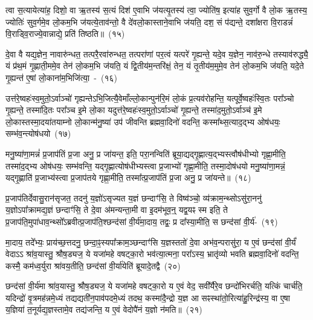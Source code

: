 त्वा स॒त्यायेत्या॑ह॒ दिशो॒ वा ऋ॒तस्य॑ स॒त्यं दिश॑ ए॒वाभि ज॑यत्यृ॒तस्य॑ त्वा॒ ज्योति॑ष॒ इत्या॑ह सुव॒र्गो वै लो॒क ऋ॒तस्य॒ ज्योतिः॑ सुव॒र्गमे॒व लो॒कम॒भि ज॑यत्ये॒ताव॑न्तो॒ वै दे॑वलो॒कास्ताने॒वाभि ज॑यति॒ दश॒ सं प॑द्यन्ते॒ दशा᳚क्षरा वि॒राडन्नं॑ वि॒राड्वि॒राज्ये॒वान्नाद्ये॒ प्रति॑ तिष्ठति॥~(१५)

{\anuvakamend[{व्यो॑मन ऋ॒तस्य॑ प्रा॒णः प॒शूने॒व विध॑र्म॒ दिव॑मे॒वाभि ज॑यत्यृ॒तस्य॒ षट्च॑त्वारिꣳशच्च}]}%

दे॒वा वै यद्य॒ज्ञेन॒ नावारु॑न्धत॒ तत्परै॒रवा॑रुन्धत॒ तत्परा॑णां पर॒त्वं यत्परे॑ गृ॒ह्यन्ते॒ यदे॒व य॒ज्ञेन॒ नाव॑रु॒न्धे तस्याव॑रुद्ध्यै॒ यं प्र॑थ॒मं गृ॒ह्णाती॒ममे॒व तेन॑ लो॒कम॒भि ज॑यति॒ यं द्वि॒तीय॑म॒न्तरि॑क्षं॒ तेन॒ यं तृ॒तीय॑म॒मुमे॒व तेन॑ लो॒कम॒भि ज॑यति॒ यदे॒ते गृ॒ह्यन्त॑ ए॒षां लो॒काना॑म॒भिजि॑त्या॒~-~(१६)

उत्त॑रे॒ष्वहः॑स्व॒मुतो॒\-ऽर्वाञ्चो॑ गृह्यन्ते\-ऽभि॒जित्यै॒वेमाँल्लो॒कान्पुन॑रि॒मं लो॒कं प्र॒त्यव॑रोहन्ति॒ यत्पूर्वे॒ष्वहः॑स्वि॒तः परा᳚ञ्चो गृ॒ह्यन्ते॒ तस्मा॑दि॒तः परा᳚ञ्च इ॒मे लो॒का यदुत्त॑रे॒ष्वहः॑स्व॒मुतो॒\-ऽर्वाञ्चो॑ गृ॒ह्यन्ते॒ तस्मा॑द॒मुतो॒\-ऽर्वाञ्च॑ इ॒मे लो॒कास्तस्मा॒द\-या॑तयाम्नो लो॒कान्म॑नु॒ष्या॑ उप॑ जीवन्ति ब्रह्मवा॒दिनो॑ वदन्ति॒ कस्मा᳚थ्स॒त्याद॒द्भ्य ओष॑धयः॒ सम्भ॑व॒न्त्योष॑धयो~(१७)

मनु॒ष्या॑णा॒मन्नं॑ प्र॒जा\-प॑तिं प्र॒जा अनु॒ प्र जा॑यन्त॒ इति॒ परा॒नन्विति॑ ब्रूया॒द्यद्गृ॒ह्णात्य॒द्भ्यस्त्वौष॑धीभ्यो गृह्णा॒मीति॒ तस्मा॑द॒द्भ्य ओष॑धयः॒ सम्भ॑वन्ति॒ यद्गृ॒ह्णात्योष॑धीभ्यस्त्वा प्र॒जाभ्यो॑ गृह्णा॒मीति॒ तस्मा॒दोष॑धयो मनु॒ष्या॑णा॒मन्नं॒ यद्गृ॒ह्णाति॑ प्र॒जाभ्य॑स्त्वा प्र॒जा\-प॑तये गृह्णा॒मीति॒ तस्मा᳚त्प्र॒जा\-प॑तिं प्र॒जा अनु॒ प्र जा॑यन्ते॥~(१८)

{\anuvakamend[{अ॒भिजि॑त्या॒ ओष॑धयो॒\-ऽष्टाच॑त्वारिꣳशच्च}]}%

प्र॒जा\-प॑तिर्देवासु॒रान॑सृजत॒ तदनु॑ य॒ज्ञो॑\-ऽसृज्यत य॒ज्ञं छन्दाꣳ॑सि॒ ते विष्व॑ञ्चो॒ व्य॑क्राम॒न्थ्सो\-ऽसु॑रा॒ननु॑ य॒ज्ञो\-ऽपा᳚क्रामद्य॒ज्ञं छन्दाꣳ॑सि॒ ते दे॒वा अ॑मन्यन्ता॒मी वा इ॒दम॑भूव॒न्॒ यद्व॒यꣴ स्म इति॒ ते प्र॒जा\-प॑ति॒मुपा॑धाव॒न्थ्सो᳚\-ऽब्रवीत्प्र॒जा\-प॑ति॒श्छन्द॑सां वी॒र्य॑मा॒दाय॒ तद्वः॒ प्र दा᳚स्या॒मीति॒ स छन्द॑सां वी॒र्य॑-~(१९)

मा॒दाय॒ तदे᳚भ्यः॒ प्राय॑च्छ॒त्तदनु॒ छन्दा॒ꣴ॒स्यपा᳚क्राम॒ञ्छन्दाꣳ॑सि य॒ज्ञस्ततो॑ दे॒वा अभ॑व॒न्परासु॑रा॒ य ए॒वं छन्द॑सां वी॒र्यं॑ वेदाऽऽ श्रा॑व॒यास्तु॒ श्रौष॒ड्यज॒ ये यजा॑महे वषट्का॒रो भव॑त्या॒त्मना॒ परा᳚\-ऽस्य॒ भ्रातृ॑व्यो भवति ब्रह्मवा॒दिनो॑ वदन्ति॒ कस्मै॒ कम॑ध्व॒र्युरा श्रा॑वय॒तीति॒ छन्द॑सां वी॒र्या॑येति॑ ब्रूयादे॒तद्वै~(२०)

छन्द॑सां वी॒र्य॑मा श्रा॑व॒यास्तु॒ श्रौष॒ड्यज॒ ये यजा॑महे वषट्का॒रो य ए॒वं वेद॒ सवी᳚र्यैरे॒व छन्दो॑भिरर्चति॒ यत्किं चार्च॑ति॒ यदिन्द्रो॑ वृ॒त्रमह॑न्नमे॒ध्यं तद्यद्यती॑न॒पाव॑पदमे॒ध्यं तदथ॒ कस्मा॑दै॒न्द्रो य॒ज्ञ आ सꣴस्था॑तो॒रित्या॑हु॒रिन्द्र॑स्य॒ वा ए॒षा य॒ज्ञिया॑ त॒नूर्यद्य॒ज्ञस्तामे॒व तद्य॑जन्ति॒ य ए॒वं वेदोपै॑नं य॒ज्ञो न॑मति॥~(२१)

